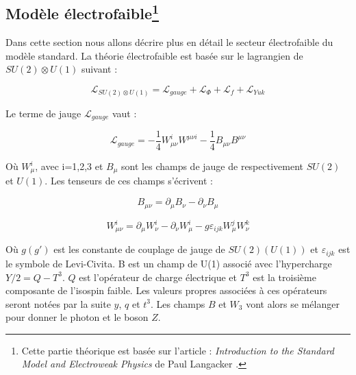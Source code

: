   \subsection[Mod\`ele \'electrofaible]{Mod\`ele \'electrofaible\protect\footnote{Cette partie th\'eorique est bas\'ee sur l'article : \textit{Introduction to the Standard Model and Electroweak Physics} de Paul Langacker \cite{Langacker:2009my}.}}

  Dans cette section nous allons d\'ecrire plus en d\'etail le secteur \'electrofaible du mod\`ele standard. La th\'eorie \'electrofaible \cite{Glashow:1961tr, Weinberg:1967tq} est bas\'ee sur le lagrangien de $SU(2) \otimes U(1)$ suivant :
  
  \begin{equation}
   \mathcal{L}_{SU(2) \otimes U(1)} = \mathcal{L}_{gauge} + \mathcal{L}_{\Phi} + \mathcal{L}_{f} + \mathcal{L}_{Yuk}
  \end{equation}

  Le terme de jauge $\mathcal{L}_{gauge}$ vaut :
  
  \begin{equation}
   \mathcal{L}_{gauge} = - \dfrac{1}{4} W^i_{\mu \nu} W^{\mu \nu i} - \dfrac{1}{4} B_{\mu\nu} B^{\mu \nu}
  \end{equation}

  O\`u $W^i_{\mu}$, avec i=1,2,3 et $B_{\mu}$ sont les champs de jauge de respectivement $SU(2)$ et $U(1)$. Les tenseurs de ces champs s'\'ecrivent : 
  
  \begin{equation}
   B_{\mu \nu} = \partial_{\mu} B_{\nu} - \partial_{\nu} B_{\mu}
  \end{equation}

  \begin{equation}
   W^i_{\mu \nu} = \partial_{\mu} W^i_{\nu} - \partial_{\nu} W^i_{\mu} - g \varepsilon_{ijk} W_{\mu}^j W_{\nu}^k 
  \end{equation}

  O\`u $g(g')$ est les constante de couplage de jauge de $SU(2)(U(1))$ et $\varepsilon_{ijk}$ est le symbole de Levi-Civita. B est un champ de U(1) associ\'e avec l'hypercharge $Y/2 = Q - T^3$. $Q$ est l'op\'erateur de charge \'electrique et $T^3$ est la troisi\`eme composante de l'isospin faible. Les valeurs propres associ\'ees \`a ces op\'erateurs seront not\'ees par la suite $y$, $q$ et $t^3$. Les champs $B$ et $W_3$ vont alors se m\'elanger pour donner le photon et le boson $Z$.
  
  \medskip
  

